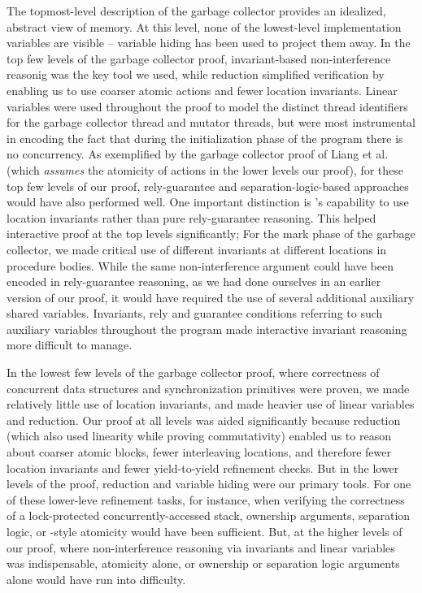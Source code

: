 The topmost-level description of the garbage collector provides an
idealized, abstract view of memory. 
At this level, none of the lowest-level implementation variables are
visible -- variable hiding has been used to project them away. 
In the top few levels of the garbage collector proof, invariant-based
non-interference reasonig was the key tool we used, while reduction
simplified verification by enabling us to use coarser atomic actions and fewer
location invariants.  
Linear variables were used throughout the proof to model the distinct
thread identifiers for the garbage collector thread and mutator
threads, but were most instrumental in encoding the fact that during
the initialization phase of the program there is no concurrency.
As exemplified by the
garbage collector proof of Liang et al.~\cite{LiangRGSim} (which
{\em assumes} the atomicity of actions in the lower levels our proof),
for these top few levels of our proof, rely-guarantee and separation-logic-based
approaches would have also performed well. 
One important distinction is \civl's capability to use location invariants rather than pure rely-guarantee reasoning.
This helped interactive proof at the top levels significantly;
For the mark phase of the garbage collector, we made critical use of different invariants at different
locations in procedure bodies. 
While the same non-interference argument could have been encoded in
rely-guarantee reasoning, as we had done ourselves in an earlier
version of our proof, 
it would have required the use of several additional auxiliary shared variables. 
Invariants, rely and guarantee conditions referring to such auxiliary
variables throughout the program made interactive invariant reasoning more difficult to manage. 

In the lowest few levels of the garbage collector proof, where
correctness of concurrent data structures and synchronization primitives were proven, we made
relatively little use of location invariants, and made heavier use of
linear variables and reduction.
Our proof at all levels was aided significantly because
reduction (which also used linearity while proving commutativity)
enabled us to reason about coarser atomic blocks, fewer interleaving
locations, and therefore fewer location invariants and fewer 
yield-to-yield refinement checks. 
But in the lower levels of the proof, reduction and variable hiding were our primary
tools. 
For one of these lower-leve refinement tasks, for instance, when verifying the correctness of a
lock-protected concurrently-accessed stack, ownership
arguments, separation logic, or \QED-style atomicity would have been
sufficient. 
But, at the higher levels of our proof, where non-interference
reasoning via invariants and linear variables was indispensable, 
atomicity alone, or ownership or separation logic arguments alone
would have run into difficulty. 

